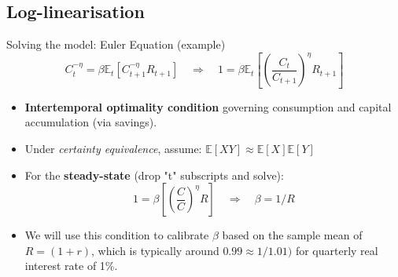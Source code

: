 \documentclass[10pt, handout]{beamer} %
\begin{document}
\subsection{Log-linearisation}


\begin{frame}{Solving the model: Euler Equation (example)}
\begin{equation}\nonumber
    C_t^{-\eta} = \beta \mathbb{E}_t\left[ C_{t+1}^{-\eta} R_{t+1} \right] \quad \Rightarrow \quad 1 = \beta \mathbb{E}_t\left[ \left( \frac{C_t}{C_{t+1}} \right)^{\eta} R_{t+1} \right]
\end{equation}
\begin{itemize}
    \item \textbf{Intertemporal optimality condition} governing consumption and capital accumulation (via savings).
    \item Under \textit{certainty equivalence}, assume: $\mathbb{E}\left[XY\right] \approx \mathbb{E}\left[X\right]\mathbb{E}\left[Y\right]$
    \item For the \textbf{steady-state} (drop "t" subscripts and solve):
    \begin{equation}\nonumber
   1 = \beta \left[ \left( \frac{C}{C} \right)^{\eta} R \right] \quad \Rightarrow \quad \beta = 1/R
\end{equation}
	\item We will use this condition to calibrate $\beta$ based on the sample mean of $R = (1+r)$, which is typically around $0.99 \approx 1/1.01)$ for quarterly real interest rate of 1\%.
\end{itemize}
\end{frame}
\end{document}

